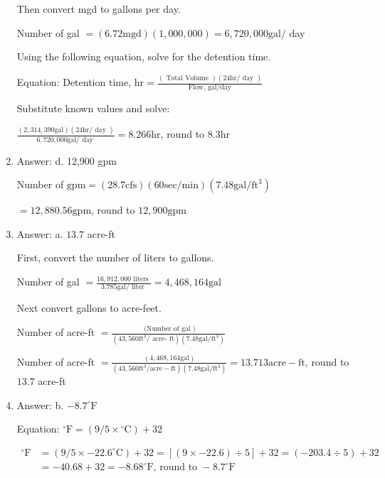 \documentclass[10pt]{article}
\begin{document}
\begin{enumerate}
Then convert mgd to gallons per day.

Number of gal $=(6.72 \mathrm{mgd})(1,000,000)=6,720,000 \mathrm{gal} /$ day

Using the following equation, solve for the detention time.

Equation: Detention time, $\mathrm{hr}=\frac{(\text { Total Volume })(24 \mathrm{hr} / \text { day })}{\text { Flow, gal/day }}$

Substitute known values and solve:

$\frac{(2,314,390 \mathrm{gal})(24 \mathrm{hr} / \text { day })}{6,720,000 \mathrm{gal} / \text { day }}=8.266 \mathrm{hr}$, round to $8.3 \mathrm{hr}$

  \item Answer: d. 12,900 gpm

Number of $\mathrm{gpm}=(28.7 \mathrm{cfs})(60 \mathrm{sec} / \mathrm{min})\left(7.48 \mathrm{gal} / \mathrm{ft}^{3}\right)$

$=12,880.56 \mathrm{gpm}$, round to $12,900 \mathrm{gpm}$

  \item Answer: a. $13.7$ acre-ft

First, convert the number of liters to gallons.

Number of gal $=\frac{16,912,000 \text { liters }}{3.785 \mathrm{gal} / \text { liter }}=4,468,164 \mathrm{gal}$

Next convert gallons to acre-feet.

Number of acre-ft $=\frac{\text { (Number of gal })}{\left(43,560 \mathrm{ft}^{3} / \text { acre- } \mathrm{ft}\right)\left(7.48 \mathrm{gal} / \mathrm{ft}^{3}\right)}$

Number of acre-ft $=\frac{(4,468,164 \mathrm{gal})}{\left(43,560 \mathrm{ft}^{3} / \mathrm{acre}-\mathrm{ft}\right)\left(7.48 \mathrm{gal} / \mathrm{ft}^{3}\right)}=13.713 \mathrm{acre}-\mathrm{ft}$, round to $13.7$ acre-ft

  \item Answer: b. $-8.7^{\circ} \mathrm{F}$

Equation: ${ }^{\circ} \mathrm{F}=\left(9 / 5 \times{ }^{\circ} \mathrm{C}\right)+32$

$$
\begin{aligned}
{ }^{\circ} \mathrm{F} &=\left(9 / 5 \times-22.6^{\circ} \mathrm{C}\right)+32=[(9 \times-22.6) \div 5]+32=(-203.4 \div 5)+32 \\
&=-40.68+32=-8.68^{\circ} \mathrm{F} \text {, round to }-8.7^{\circ} \mathrm{F}
\end{aligned}
$$


\end{enumerate}
\end{document}
